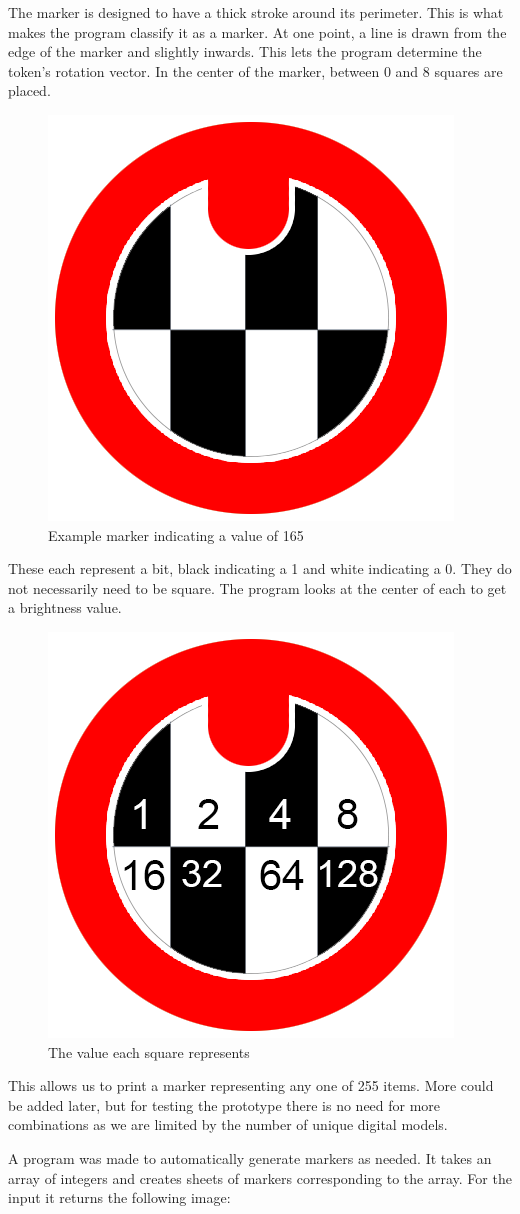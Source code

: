 The marker is designed to have a thick stroke around its perimeter. This is what makes the program classify it as a marker. At one point, a line is drawn from the edge of the marker and slightly inwards. This lets the program determine the token's rotation vector. In the center of the marker, between 0 and 8 squares are placed.
\begin{figure}[H]
	\centering
	\includegraphics[width=0.3\linewidth]{figure/Design/markerExample.png}
	\caption{Example marker indicating a value of 165}
	\label{fig:circle2}
\end{figure}

These each represent a bit, black indicating a 1 and white indicating a 0. They do not necessarily need to be square. The program looks at the center of each to get a brightness value.

\begin{figure}[H]
	\centering
	\includegraphics[width=0.3\linewidth]{figure/Design/markerValues.png}
	\caption{The value
		 each square represents}
	\label{fig:circle}
\end{figure}

This allows us to print a marker representing any one of 255 items. More could be added later, but for testing the prototype there is no need for more combinations as we are limited by the number of unique digital models.

A program was made to automatically generate markers as needed. It takes an array of integers and creates sheets of markers corresponding to the array. For the input  it returns the following image:

